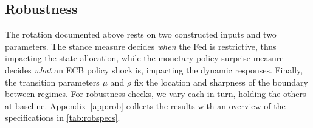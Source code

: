 



\subsection{Robustness}\label{sec:results_rob}
The rotation documented above rests on two constructed inputs and two  parameters. The stance measure decides \textit{when} the Fed is restrictive, thus impacting the state allocation, while the monetary policy surprise measure decides \textit{what} an ECB policy shock is, impacting the dynamic responses. Finally, the transition parameters $\mu$ and $\rho$ fix the location and sharpness of the boundary between regimes. For robustness checks, we vary each in turn, holding the others at baseline. Appendix~\ref{app:rob} collects the results with an overview of the specifications in \autoref{tab:robspecs}.


